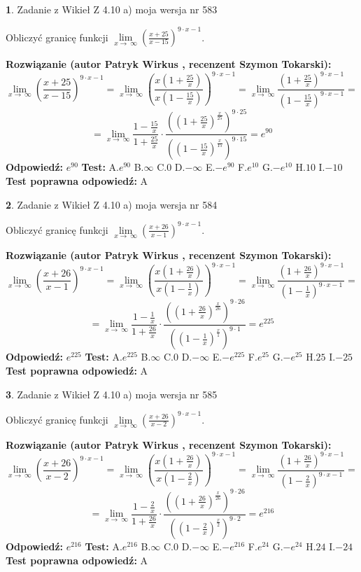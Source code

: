 \documentclass[12pt, a4paper]{article}
\theoremstyle{definition} %
\newtheorem{zad}{}
\newcommand{\zadStart}[1]{\begin{zad}#1\newline}
\newcommand{\zadStop}{\end{zad}}
\newcommand{\rozwStart}[2]{\noindent \textbf{Rozwiązanie (autor #1 , recenzent #2): }\newline}
\newcommand{\rozwStop}{\newline}
\newcommand{\odpStart}{\noindent \textbf{Odpowiedź:}\newline}
\newcommand{\odpStop}{\newline}
\newcommand{\testStart}{\noindent \textbf{Test:}\newline}
\newcommand{\testStop}{\newline}
\newcommand{\kluczStart}{\noindent \textbf{Test poprawna odpowiedź:}\newline}
\newcommand{\kluczStop}{\newline}
\begin{document}
\zadStart{Zadanie z Wikieł Z 4.10 a) moja wersja nr 583}

Obliczyć granicę funkcji  $\lim\limits_{x\to\ \infty}(\frac{x+25}{x-15})^{9\cdot x-1}$.
\zadStop
\rozwStart{Patryk Wirkus}{Szymon Tokarski}
$$\lim\limits_{x\to\ \infty}(\frac{x+25}{x-15})^{9\cdot x-1} = \lim\limits_{x\to\ \infty}(\frac{x(1+\frac{25}{x})}{x(1-\frac{15}{x})})^{9\cdot x-1}=\lim\limits_{x\to\ \infty}\frac{(1+\frac{25}{x})^{9\cdot x-1}}{(1-\frac{15}{x})^{9\cdot x-1}}=$$
$$=\lim\limits_{x\to\ \infty}\frac{1-\frac{15}{x}}{1+\frac{25}{x}}\cdot\frac{((1+\frac{25}{x})^{\frac{x}{25}})^{9\cdot25}}{((1-\frac{15}{x})^{\frac{x}{15}})^{9\cdot15}}=e^{90}$$
\rozwStop
\odpStart
$e^{90}$
\odpStop
\testStart
A.$e^{90}$ B.$\infty$ C.$0$ D.$-\infty$ E.$-e^{90}$
F.$e^{10}$ G.$-e^{10}$
H.$10$
I.$-10$
\testStop
\kluczStart
A
\kluczStop



\zadStart{Zadanie z Wikieł Z 4.10 a) moja wersja nr 584}

Obliczyć granicę funkcji  $\lim\limits_{x\to\ \infty}(\frac{x+26}{x-1})^{9\cdot x-1}$.
\zadStop
\rozwStart{Patryk Wirkus}{Szymon Tokarski}
$$\lim\limits_{x\to\ \infty}(\frac{x+26}{x-1})^{9\cdot x-1} = \lim\limits_{x\to\ \infty}(\frac{x(1+\frac{26}{x})}{x(1-\frac{1}{x})})^{9\cdot x-1}=\lim\limits_{x\to\ \infty}\frac{(1+\frac{26}{x})^{9\cdot x-1}}{(1-\frac{1}{x})^{9\cdot x-1}}=$$
$$=\lim\limits_{x\to\ \infty}\frac{1-\frac{1}{x}}{1+\frac{26}{x}}\cdot\frac{((1+\frac{26}{x})^{\frac{x}{26}})^{9\cdot26}}{((1-\frac{1}{x})^{\frac{x}{1}})^{9\cdot1}}=e^{225}$$
\rozwStop
\odpStart
$e^{225}$
\odpStop
\testStart
A.$e^{225}$ B.$\infty$ C.$0$ D.$-\infty$ E.$-e^{225}$
F.$e^{25}$ G.$-e^{25}$
H.$25$
I.$-25$
\testStop
\kluczStart
A
\kluczStop



\zadStart{Zadanie z Wikieł Z 4.10 a) moja wersja nr 585}

Obliczyć granicę funkcji  $\lim\limits_{x\to\ \infty}(\frac{x+26}{x-2})^{9\cdot x-1}$.
\zadStop
\rozwStart{Patryk Wirkus}{Szymon Tokarski}
$$\lim\limits_{x\to\ \infty}(\frac{x+26}{x-2})^{9\cdot x-1} = \lim\limits_{x\to\ \infty}(\frac{x(1+\frac{26}{x})}{x(1-\frac{2}{x})})^{9\cdot x-1}=\lim\limits_{x\to\ \infty}\frac{(1+\frac{26}{x})^{9\cdot x-1}}{(1-\frac{2}{x})^{9\cdot x-1}}=$$
$$=\lim\limits_{x\to\ \infty}\frac{1-\frac{2}{x}}{1+\frac{26}{x}}\cdot\frac{((1+\frac{26}{x})^{\frac{x}{26}})^{9\cdot26}}{((1-\frac{2}{x})^{\frac{x}{2}})^{9\cdot2}}=e^{216}$$
\rozwStop
\odpStart
$e^{216}$
\odpStop
\testStart
A.$e^{216}$ B.$\infty$ C.$0$ D.$-\infty$ E.$-e^{216}$
F.$e^{24}$ G.$-e^{24}$
H.$24$
I.$-24$
\testStop
\kluczStart
A
\kluczStop
\end{document}
